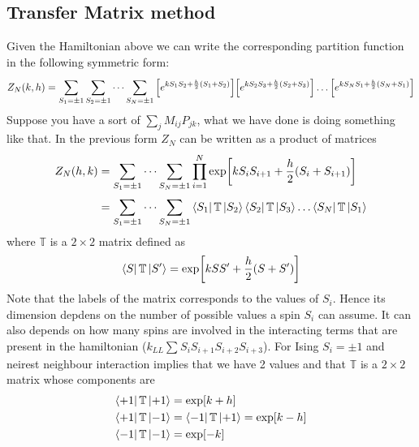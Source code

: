 \documentclass[../main/main.tex]{subfiles}
\begin{document}

\subsection{Transfer Matrix method}
Given the Hamiltonian above we can write the corresponding partition function in the following symmetric form:
\begin{equation}
  Z_N (k,h) = \sum_{S_1 = \pm 1}^{} \sum_{S_2 = \pm 1}^{}  \dots \sum_{S_N = \pm 1}^{}
  \qty[e^{k S_1 S_2 + \frac{h}{2}(S_1+S_2)} ] \qty[e^{k S_2 S_3 + \frac{h}{2}(S_2+S_3)} ] \dots \qty[e^{k S_N S_1 + \frac{h}{2}(S_N+S_1)} ]
\end{equation}
Suppose you have a sort of \( \sum_{j}^{}  M_{ij} P_{jk} \), what we have done is doing something like that.
In the previous form \( Z_N \) can be written as a product of matrices
\begin{equation}
\begin{split}
Z_N (h,k)  &= \sum_{S_1 = \pm 1}^{} \dots \sum_{S_N = \pm 1}^{} \prod_{i=1}^{N} \exp [k S_i S_{i+1} + \frac{h}{2} (S_i + S_{i+1})] \\
& =  \sum_{S_1 = \pm 1}^{} \dots \sum_{S_N = \pm 1}^{} \bra{S_1} \mathbb{T} \ket{S_2} \bra{S_2}  \mathbb{T} \ket{S_3} \dots \bra{S_N}  \mathbb{T} \ket{S_1}
\end{split}
\end{equation}
where \( \mathbb{T} \) is a \( 2 \times 2 \)  matrix defined as
\begin{equation}
  \bra{S} \mathbb{T} \ket{S'} = \exp [k S S' + \frac{h}{2} (S+S')]
\end{equation}
Note that the labels of the matrix corresponds to the values of \( S_i \). Hence its dimension depdens on the number of possible values a spin \( S_i \) can assume.
It can also depends on how many spins are involved in the interacting terms that are present in the hamiltonian (\( k_{LL} \sum_{}^{} S_i S_{i+1} S_{i+2} S_{i+3}  \)). For Ising \( S_i = \pm 1 \) and neirest neighbour interaction implies that we have 2 values and that \( \mathbb{T} \) is a \( 2 \times 2 \) matrix whose components are
\begin{subequations}
\begin{align}
  \bra{+1} \mathbb{T} \ket{+1} &= \exp [k+h]  \\
    \bra{+1} \mathbb{T} \ket{-1} &=   \bra{-1} \mathbb{T} \ket{+1} = \exp [k-h] \\
      \bra{-1} \mathbb{T} \ket{-1} &= \exp [-k]
\end{align}
\end{subequations}
\end{document}
